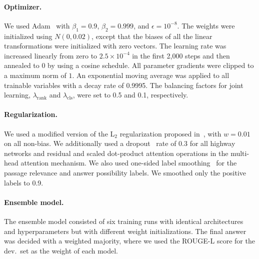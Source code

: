 \documentclass[11pt,a4paper]{article}
\theoremstyle{mydef}
\theoremstyle{myprob}
\begin{document}
\paragraph{Optimizer.}
We used Adam~\citep{KingmaB15} with $\beta_1 = 0.9$, $\beta_2 = 0.999$, and $\epsilon = 10^{-8}$. The weights were initialized using $N(0, 0.02)$, except that the biases of all the linear transformations were initialized with zero vectors. The learning rate was increased linearly from zero to $2.5 \times 10^{-4}$ in the first 2,000 steps and then annealed to 0 by using a cosine schedule. All parameter gradients were clipped to a maximum norm of $1$. An exponential moving average was applied to all trainable variables with a decay rate of 0.9995. The balancing factors for joint learning, $\lambda_\mathrm{rank}$ and $\lambda_\mathrm{cls}$, were set to 0.5 and 0.1, respectively.

\paragraph{Regularization.}

We used a modified version of the L$_2$ regularization proposed in~\citep{LoshchilovH17}, with $w = 0.01$ on all non-bias. 
We additionally used a dropout~\citep{SrivastavaHKSS14} rate of 0.3 for all highway networks and residual and scaled dot-product attention operations in the multi-head attention mechanism. We also used one-sided label smoothing~\citep{SzegedyVISW16} for the passage relevance and answer possibility labels. We smoothed only the positive labels to 0.9.


\paragraph{Ensemble model.}
The ensemble model consisted of six training runs with identical architectures and hyperparameters but with different weight initializations.
The final answer was decided with a weighted majority, where we used the ROUGE-L score for the dev.~set as the weight of each model.
\end{document}
